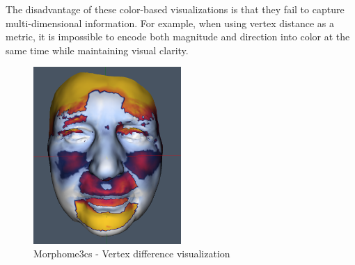 The disadvantage of these color-based visualizations is that they fail to capture multi-dimensional information. For example, when using vertex distance as a metric, it is impossible to encode both magnitude and direction into color at the same time while maintaining visual clarity.

\begin{figure}[h]
\centering
\includegraphics[width=0.5\textwidth]{./img/morpho-example01.PNG}
\caption{Morphome3cs - Vertex difference visualization}
\label{fig:morpho_example}
\end{figure}

